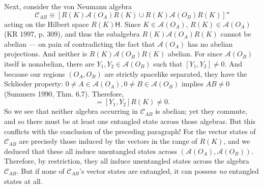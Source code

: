 \documentclass[12pt]{article}
\newcommand{\alg}[1]{\mbox{$\mathcal{#1}$}}
\newcommand{\hil}[1]{\mbox{$\mathsf{#1}$}}
\begin{document}
       Next, consider the von 
       Neumann algebra
       \begin{equation}
       \alg{C}_{AB}\equiv [R(K)\alg{A}(O_{A})R(K)\cup 
       R(K)\alg{A}(O_{B})R(K)]''
       \end{equation}
       acting on 
       the Hilbert space 
       $R(K)\hil{H}$.
              Since $K\in\alg{A}(O_{A})$, $R(K)\in\alg{A}(O_{A})$ (KR 1997, p. 309), and 
       thus the subalgebra $R(K)\alg{A}(O_{A})R(K)$ cannot be abelian --- on pain of 
       contradicting the fact that $\alg{A}(O_{A})$ has no 
       abelian projections.  And neither is $R(K)\alg{A}(O_{B})R(K)$ abelian.  For 
       since $\alg{A}(O_{B})$ itself is nonabelian, there are $Y_{1},Y_{2}\in\alg{A}(O_{B})$ such 
       that $[Y_{1},Y_{2}]\not=0$.  And because our regions 
       $(O_{A},O_{B})$ are strictly spacelike separated, they have 
       the Schlieder property: $0\not=A\in \alg{A}(O_{A}), 
       0\not=B\in \alg{A}(O_{B})$ implies $AB\not=0$ (Summers 1990, 
       Thm. 6.7).
       Therefore, 
       \begin{equation}
       [R(K)Y_{1}R(K),R(K)Y_{2}R(K)]=[Y_{1},Y_{2}]R(K)\not=0.
       \end{equation}
       So we see that neither algebra occurring in $\alg{C}_{AB}$ is 
       abelian; yet they commute, and so there must be at least one 
       entangled state across those algebras.  
       But this conflicts with the conclusion of the preceding 
       paragraph!  For the vector states of $\alg{C}_{AB}$ are precisely 
       those induced by the vectors in the range of $R(K)$, and 
       we deduced that these all induce unentangled states across 
       $(\alg{A}(O_{A}),\alg{A}(O_{B}))$.  Therefore, by restriction, they all 
       induce unentangled states across the algebra $\alg{C}_{AB}$.  But 
       if none of
       $\alg{C}_{AB}$'s 
       vector states are 
       entangled, it can possess \emph{no} entangled states at all.
       
\end{document}
